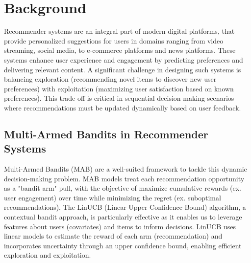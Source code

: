 \section{Background}

Recommender systems are an integral part of modern digital platforms, that provide personalized suggestions for users in domains ranging from video streaming, social media, to e-commerce platforms and news platforms. These systems enhance user experience and engagement by predicting preferences and delivering relevant content. A significant challenge in designing such systems is balancing exploration (recommending novel items to discover new user preferences) with exploitation (maximizing user satisfaction based on known preferences). This trade-off is critical in sequential decision-making scenarios where recommendations must be updated dynamically based on user feedback. 

\subsection{Multi-Armed Bandits in Recommender Systems}
Multi-Armed Bandits (MAB) are a well-suited framework to tackle this dynamic decision-making problem. MAB models treat each recommendation opportunity as a "bandit arm" pull, with the objective of maximize cumulative rewards (ex. user engagement) over time while minimizing the regret (ex. suboptimal recommendations). The LinUCB (Linear Upper Confidence Bound) algorithm, a contextual bandit approach, is particularly effective as it enables us to leverage features about users (covariates) and items to inform decisions. LinUCB uses linear models to estimate the reward of each arm (recommendation) and incorporates uncertainty through an upper confidence bound, enabling efficient exploration and exploitation.



